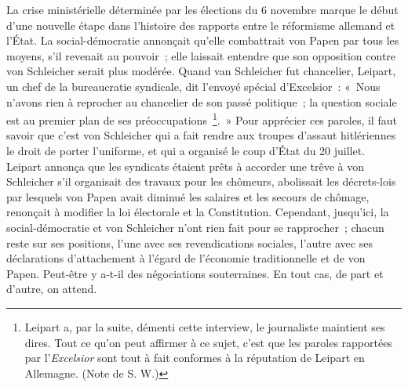 \documentclass[french,twoside]{book} %
\begin{document}
La crise ministérielle déterminée par les élections du 6 novembre marque le début d'une nouvelle étape dans l'histoire des rapports entre le réformisme allemand et l’État. La social-démocratie annonçait qu'elle combattrait von Papen par tous les moyens, s'il revenait au pouvoir ; elle laissait entendre que son opposition contre von Schleicher serait plus modérée. Quand van Schleicher fut chancelier, Leipart, un chef de la bureaucratie syndicale, dit l'envoyé spécial d'Excelsior : « Nous n'avons rien à reprocher au chancelier de son passé politique ; la question sociale est au premier plan de ses préoccupations \footnote{ Leipart a, par la suite, démenti cette interview, le journaliste maintient ses dires. Tout ce qu'on peut affirmer à ce sujet, c'est que les paroles rapportées par l'{\itshape Excelsior} sont tout à fait conformes à la réputation de Leipart en Allemagne. (Note de S. W.)}. » Pour apprécier ces paroles, il faut savoir que c'est von Schleicher qui a fait rendre aux troupes d'assaut hitlériennes le droit de porter l'uniforme, et qui a organisé le coup d'État du 20 juillet. Leipart annonça que les syndicats étaient prêts à accorder une trêve à von Schleicher s'il organisait des travaux pour les chômeurs, abolissait les décrets-lois par lesquels von Papen avait diminué les salaires et les secours de chômage, renonçait à modifier la loi électorale et la Constitution. Cependant, jusqu'ici, la social-démocratie et von Schleicher n'ont rien fait pour se rapprocher ; chacun reste sur ses positions, l'une avec ses revendications sociales, l'autre avec ses déclarations d'attachement à l'égard de l'économie traditionnelle et de von Papen. Peut-être y a-t-il des négociations souterraines. En tout cas, de part et d'autre, on attend.\par
\end{document}
